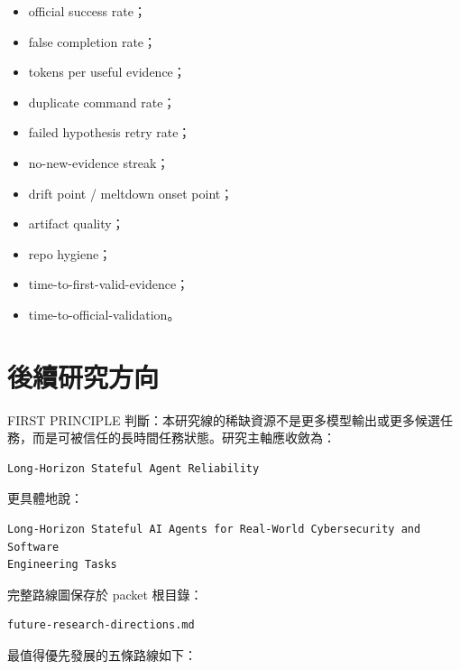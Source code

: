 \documentclass[UTF8,a4paper,11pt]{ctexart}
\begin{document}
\begin{itemize}
  \item official success rate；
  \item false completion rate；
  \item tokens per useful evidence；
  \item duplicate command rate；
  \item failed hypothesis retry rate；
  \item no-new-evidence streak；
  \item drift point / meltdown onset point；
  \item artifact quality；
  \item repo hygiene；
  \item time-to-first-valid-evidence；
  \item time-to-official-validation。
\end{itemize}

\section{後續研究方向}

FIRST PRINCIPLE 判斷：本研究線的稀缺資源不是更多模型輸出或更多候選任務，而是可被信任的長時間任務狀態。研究主軸應收斂為：

\begin{Verbatim}[fontsize=\small]
Long-Horizon Stateful Agent Reliability
\end{Verbatim}

更具體地說：

\begin{Verbatim}[fontsize=\small]
Long-Horizon Stateful AI Agents for Real-World Cybersecurity and Software
Engineering Tasks
\end{Verbatim}

完整路線圖保存於 packet 根目錄：

\begin{Verbatim}[fontsize=\small]
future-research-directions.md
\end{Verbatim}

最值得優先發展的五條路線如下：
\end{document}
